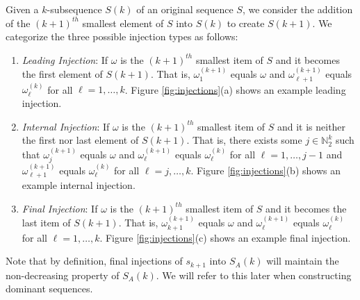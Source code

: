 \begin{definition}\label{def:subseq-injection}
Given a $k$-subsequence $S(k)$ of an original sequence $S$, we consider the addition of the $(k+1)^{th}$ smallest element of $S$ into $S(k)$ to create $S(k+1)$.
 We categorize the three possible injection types as follows:
\begin{enumerate}
    \item \emph{Leading Injection}:  If $\omega$ is the $(k+1)^{th}$ smallest item of $S$ and it becomes the first element of $S(k+1)$.  That is, $\omega^{(k+1)}_1$ equals $\omega$ and $\omega^{(k+1)}_{\ell+1}$ equals $\omega^{(k)}_{\ell}$ for all $\ell = 1,\ldots, k$. Figure \ref{fig:injections}(a) shows an example leading injection.
%
    \item \emph{Internal Injection}:  If $\omega$ is the $(k+1)^{th}$ smallest item of $S$ and it is neither the first nor last element of $S(k+1)$.  That is, there exists some $j \in \mathbb{N}_2^{k}$ such that  $\omega^{(k+1)}_{j}$ equals $\omega$ and $\omega^{(k+1)}_\ell$ equals $\omega^{(k)}_{\ell}$ for all $\ell = 1,\ldots, j-1$ and $\omega^{(k+1)}_{\ell+1}$ equals $\omega^{(k)}_{\ell}$ for all $\ell = j,\ldots,k$. Figure \ref{fig:injections}(b) shows an example internal injection.
%    
    \item \emph{Final Injection}:  If $\omega$ is the $(k+1)^{th}$ smallest item of $S$ and it becomes the last item of $S(k+1)$.  That is, $\omega^{(k+1)}_{k+1}$ equals $\omega$ and $\omega^{(k+1)}_\ell$ equals $\omega^{(k)}_{\ell}$ for all $\ell = 1,\ldots, k$. Figure \ref{fig:injections}(c) shows an example final injection.
\end{enumerate}
Note that by definition, final injections of $s_{k+1}$ into $S_A(k)$ will maintain the non-decreasing property of $S_A(k)$. We will refer to this later when constructing dominant sequences.
\end{definition}

